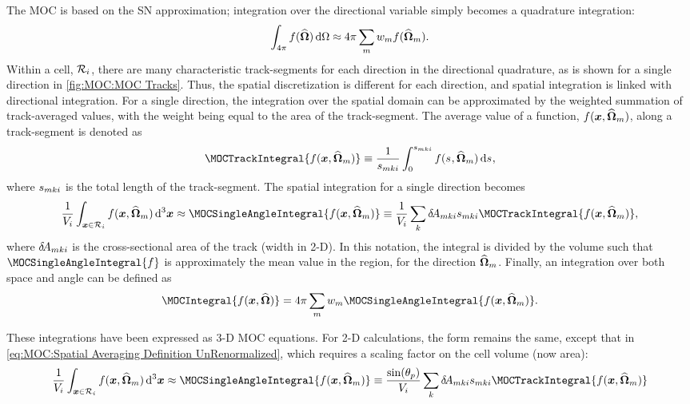 {{{            The \ac{MOC} is based on the \acf{SN} approximation; integration over the directional variable simply becomes a quadrature integration:
            \begin{equation}\label{eq:MOC:Directional Quadrature Integration}
                \intl[\fourpi]f(\dir)\ddir \approx \fourpi\suml[m]\wt[m]f(\dirm).
            \end{equation}
            Within a cell, $\Region$, there are many characteristic track-segments for each direction in the directional quadrature, as is shown for a single direction in \cref{fig:MOC:MOC Tracks}.
            Thus, the spatial discretization is different for each direction, and spatial integration is linked with directional integration.
            For a single direction, the integration over the spatial domain can be approximated by the weighted summation of track-averaged values, with the weight being equal to the area of the track-segment.
            The average value of a function, $f(\loc,\dirm)$, along a track-segment is denoted as
            \begin{equation}\label{eq:MOC:Track-Averaged Definition UnRenormalized}
                \MOCTrackIntegral{f(\loc,\dirm)} \defined \frac{1}{\segl}\intl[0][\segl]f(\len,\dirm)\dif{\len},
            \end{equation}
            where $\segl$ is the total length of the track-segment.
            The spatial integration for a single direction becomes
            \begin{equation}\label{eq:MOC:Spatial Averaging Definition UnRenormalized}
                \frac{1}{V_i}\intl[\loc\in\Region]f(\loc,\dirm)\dif^3{\loc} \approx \MOCSingleAngleIntegral{f(\loc,\dirm)} \defined \frac{1}{V_i}\suml[k]\tA[mki]\segl\MOCTrackIntegral{f(\loc,\dirm)} ,
            \end{equation}
            where $\tA[mki]$ is the cross-sectional area of the track (width in 2-D).
            In this notation, the integral is divided by the volume such that $\MOCSingleAngleIntegral{f}$ is approximately the mean value in the region, for the direction $\dirm$.
            Finally, an integration over both space and angle can be defined as
            \begin{equation}\label{eq:MOC:Spatial and Directional Integration Definition}
                \MOCIntegral{f(\loc,\dir)} = \fourpi\suml[m]\wt[m]\MOCSingleAngleIntegral{f(\loc,\dirm)}.
            \end{equation}

            These integrations have been expressed as 3-D \ac{MOC} equations.
            For 2-D calculations, the form remains the same, except that in \cref{eq:MOC:Spatial Averaging Definition UnRenormalized}, which requires a scaling factor on the cell volume (now area):
            \begin{equation}
              \label{eq:MOC:Spatial Averaging Definition UnRenormalized 2D}
              \frac{1}{V_i}\intl[\loc\in\Region]f(\loc,\dirm)\dif^3{\loc} \approx \MOCSingleAngleIntegral{f(\loc,\dirm)} \defined \frac{\sin(\Polar_p)}{V_i}\suml[k]\tA[mki]\segl\MOCTrackIntegral{f(\loc,\dirm)}
            \end{equation}
        }
}}
